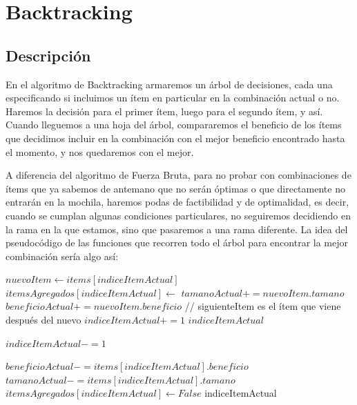 \documentclass[10pt, a4paper]{article}
\begin{document}
\section{Backtracking}
\subsection{Descripción}
En el algoritmo de Backtracking armaremos un árbol de decisiones, cada una especificando si incluimos un ítem en particular en la combinación actual o no. Haremos la decisión para el primer ítem, luego para el segundo ítem, y así. Cuando lleguemos a una hoja del árbol, compararemos el beneficio de los ítems que decidimos incluir en la combinación con el mejor beneficio encontrado hasta el momento, y nos quedaremos con el mejor.\par
A diferencia del algoritmo de Fuerza Bruta, para no probar con combinaciones de ítems que ya sabemos de antemano que no serán óptimas o que directamente no entrarán en la mochila, haremos podas de factibilidad y de optimalidad, es decir, cuando se cumplan algunas condiciones particulares, no seguiremos decidiendo en la rama en la que estamos, sino que pasaremos a una rama diferente. La idea del pseudocódigo de las funciones que recorren todo el árbol para encontrar la mejor combinación sería algo así:\par

\begin{algorithm}
\begin{algorithmic}[1]
		\State $nuevoItem \gets items[indiceItemActual]$
		\State $itemsAgregados[indiceItemActual] \gets$ 
			\State $tamanoActual += nuevoItem.tamano$
			\State $beneficioActual += nuevoItem.beneficio$
		\EndIf
		\State // siguienteItem es el ítem que viene después del nuevo
		\State $indiceItemActual += 1$
	\EndWhile
	\State \Return $indiceItemActual$
\EndFunction
\end{algorithmic}
\end{algorithm}
\newpage

\begin{algorithm}
\begin{algorithmic}[1]
		\State $indiceItemActual -= 1$
	\EndWhile

		\State $beneficioActual -= items[indiceItemActual].beneficio$
		\State $tamanoActual -= items[indiceItemActual].tamano$
		\State $itemsAgregados[indiceItemActual] \gets False$
	\EndIf
	\State \Return indiceItemActual
\EndFunction
\end{algorithmic}
\end{algorithm}
\end{document}
